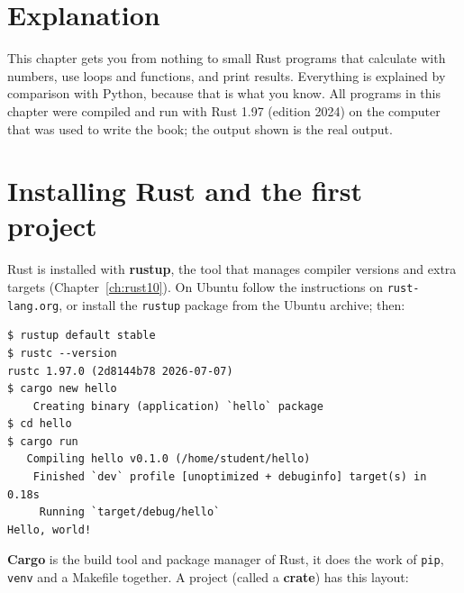 \label{ch:rust2}

\section*{Explanation}
This chapter gets you from nothing to small Rust programs that calculate with numbers, use loops and functions, and print results. Everything is explained by comparison with Python, because that is what you know. All programs in this chapter were compiled and run with Rust 1.97 (edition 2024) on the computer that was used to write the book; the output shown is the real output.

\section*{Installing Rust and the first project}
Rust is installed with \textbf{rustup}, the tool that manages compiler versions and extra targets (Chapter~\ref{ch:rust10}). On Ubuntu follow the instructions on \texttt{rust-lang.org}, or install the \verb!rustup! package from the Ubuntu archive; then:
\begin{verbatim}
$ rustup default stable
$ rustc --version
rustc 1.97.0 (2d8144b78 2026-07-07)
$ cargo new hello
    Creating binary (application) `hello` package
$ cd hello
$ cargo run
   Compiling hello v0.1.0 (/home/student/hello)
    Finished `dev` profile [unoptimized + debuginfo] target(s) in 0.18s
     Running `target/debug/hello`
Hello, world!
\end{verbatim}
\textbf{Cargo} is the build tool and package manager of Rust, it does the work of \verb!pip!, \verb!venv! and a Makefile together. A project (called a \textbf{crate}) has this layout:
\begin{center}
\end{center}

